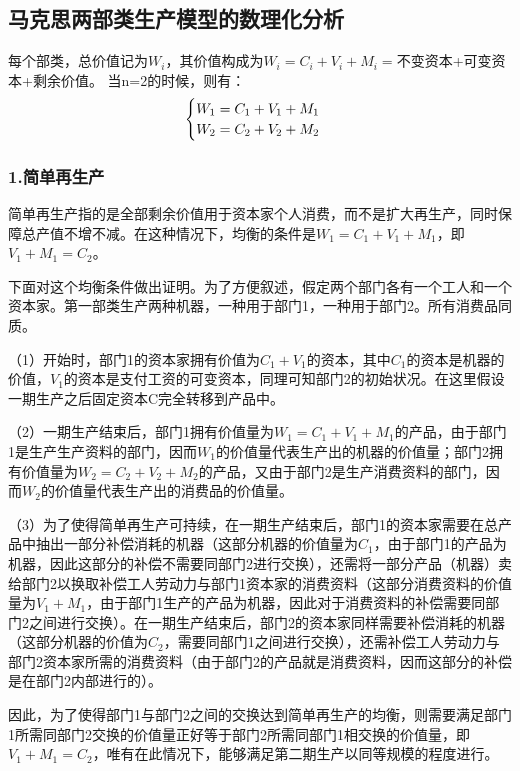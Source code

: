 \documentclass[a4paper,twoside,12pt,AutoFakeBold]{ctexart}
\begin{document}
\newpage
\subsection{马克思两部类生产模型的数理化分析}
每个部类，总价值记为$W_i$，其价值构成为\(W_i=C_i+V_i+M_i=\)不变资本+可变资本+剩余价值。
当n=2的时候，则有：
\begin{equation}
 \begin{cases}
W_1=C_1+V_1+M_1\\
W_2=C_2+V_2+M_2    
\end{cases}\notag   %
\end{equation}
\subsubsection{1.简单再生产}

简单再生产指的是全部剩余价值用于资本家个人消费，而不是扩大再生产，同时保障总产值不增不减。在这种情况下，均衡的条件是$W_1=C_1+V_1+M_1$，即$V_1+M_1=C_2$。

下面对这个均衡条件做出证明。为了方便叙述，假定两个部门各有一个工人和一个资本家。第一部类生产两种机器，一种用于部门1，一种用于部门2。所有消费品同质。

（1）开始时，部门1的资本家拥有价值为$C_1+V_1$的资本，其中$C_1$的资本是机器的价值，$V_1$的资本是支付工资的可变资本，同理可知部门2的初始状况。在这里假设一期生产之后固定资本C完全转移到产品中。

（2）一期生产结束后，部门1拥有价值量为$W_1=C_1+V_1+M_1$的产品，由于部门1是生产生产资料的部门，因而$W_1$的价值量代表生产出的机器的价值量；部门2拥有价值量为$W_2=C_2+V_2+M_2$的产品，又由于部门2是生产消费资料的部门，因而$W_2$的价值量代表生产出的消费品的价值量。

（3）为了使得简单再生产可持续，在一期生产结束后，部门1的资本家需要在总产品中抽出一部分补偿消耗的机器（这部分机器的价值量为$C_1$，由于部门1的产品为机器，因此这部分的补偿不需要同部门2进行交换），还需将一部分产品（机器）卖给部门2以换取补偿工人劳动力与部门1资本家的消费资料（这部分消费资料的价值量为$V_1+M_1$，由于部门1生产的产品为机器，因此对于消费资料的补偿需要同部门2之间进行交换）。在一期生产结束后，部门2的资本家同样需要补偿消耗的机器（这部分机器的价值为$C_2$，需要同部门1之间进行交换），还需补偿工人劳动力与部门2资本家所需的消费资料（由于部门2的产品就是消费资料，因而这部分的补偿是在部门2内部进行的）。

因此，为了使得部门1与部门2之间的交换达到简单再生产的均衡，则需要满足部门1所需同部门2交换的价值量正好等于部门2所需同部门1相交换的价值量，即$V_1+M_1=C_2$，唯有在此情况下，能够满足第二期生产以同等规模的程度进行。
\end{document}
